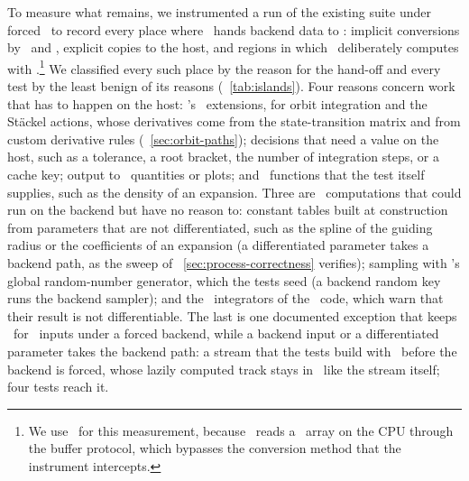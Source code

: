 To measure what remains, we instrumented a run of the existing suite
under forced \torch\ to record every place where \galpy\ hands backend
data to \numpy: implicit conversions by \numpy\ and \scipy,
explicit copies to the host, and regions in which \galpy\ deliberately
computes with \numpy.\footnote{We use \torch\ for this measurement,
  because \numpy\ reads a \jax\ array on the CPU through the buffer
  protocol, which bypasses the conversion method that the instrument
  intercepts.} We classified every such place by the reason for the
hand-off and every test by the least benign of its reasons
(\tablename~\ref{tab:islands}). Four reasons concern work that has to
happen on the host: \galpy's \cc\ extensions, for orbit integration and
the St\"{a}ckel actions, whose derivatives come from the state-transition
matrix and from custom derivative rules
(\sectionname~\ref{sec:orbit-paths}); decisions that need a value on the
host, such as a tolerance, a root bracket, the number of integration
steps, or a cache key; output to \astropy\ quantities or plots; and
\numpy\ functions that the test itself supplies, such as the density of
an expansion. Three are \numpy\ computations that could run on the
backend but have no reason to: constant tables built at construction
from parameters that are not differentiated, such as the spline of the
guiding radius or the coefficients of an expansion (a differentiated
parameter takes a backend path, as the sweep of
\sectionname~\ref{sec:process-correctness} verifies); sampling with
\numpy's global random-number generator, which the tests seed (a
backend random key runs the backend sampler); and the \python\
integrators of the \numpy\ code, which warn that their result is not
differentiable. The last is one documented exception that keeps
\numpy\ for \numpy\ inputs under a forced backend, while a backend input
or a differentiated parameter takes the backend path: a stream that the
tests build with \numpy\ before the backend is forced, whose lazily
computed track stays in \numpy\ like the stream itself; four tests
reach it.

